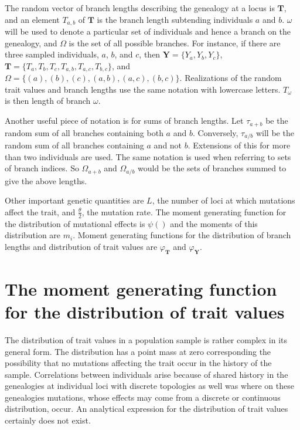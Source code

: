 \documentclass{article}
\newcommand{\T}{\frac{\theta}{2}}
\begin{document}
The random vector of branch lengths describing the genealogy at a locus is
$\mathbf{T}$, and an element $T_{a,b}$ of $\mathbf{T}$ is the branch length
subtending individuals $a$ and $b$. $\omega$ will be used to denote a particular
set of individuals and hence a branch on the genealogy, and $\Omega$ is the set
of all possible branches. For instance, if there are three sampled individuals,
$a$, $b$, and $c$, then $\mathbf{Y}=\{Y_a,Y_b,Y_c\}$,
$\mathbf{T}=\{T_a,T_b,T_c,T_{a,b},T_{a,c},T_{b,c}\}$, and
$\Omega=\{(a),(b),(c),(a,b),(a,c),(b,c)\}$. Realizations of the random trait
values and branch lengths use the same notation with lowercase letters.
$T_\omega$ is then length of branch $\omega$.

Another useful piece of notation is for sums of branch lengths. Let $\tau_{a+b}$
be the random sum of all branches containing both $a$ and $b$. Conversely,
$\tau_{a/b}$ will be the random sum of all branches containing $a$ and not $b$.
Extensions of this for more than two individuals are used. The same notation is
used when referring to sets of branch indices. So $\Omega_{a+b}$ and
$\Omega_{a/b}$ would be the sets of branches summed to give the above lengths.

Other important genetic quantities are $L$, the number of loci at which
mutations affect the trait, and $\T$, the mutation rate. The moment generating
function for the distribution of mutational effects is $\psi()$ and the moments
of this distribution are $m_i$. Moment generating functions for the distribution
of branch lengths and distribution of trait values are $\varphi_{\mathbf{T}}$
and $\varphi_{\mathbf{Y}}$.

\section{The moment generating function for the distribution of trait values}
The distribution of trait values in a population sample is rather complex in its
general form. The distribution has a point mass at zero corresponding the
possibility that no mutations affecting the trait occur in the history of the
sample. Correlations between individuals arise because of shared history in the
genealogies at individual loci with discrete topologies as well was where on
these genealogies mutations, whose effects may come from a discrete or
continuous distribution, occur. An analytical expression for the distribution of
trait values certainly does not exist.
\end{document}
